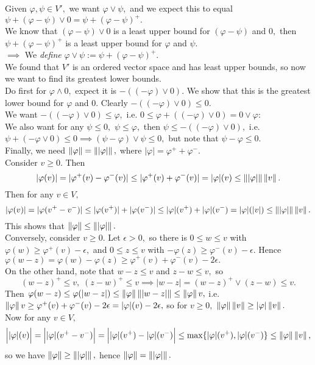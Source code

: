 \begin{thm}
{\begin{enumerate}
		Given $\varphi,\psi\in V',$ we want $\varphi\lor\psi,$ and we expect this to equal \\ $\psi+(\varphi-\psi)\lor 0=\psi+(\varphi-\psi)^+.$ \\
		We know that $(\varphi-\psi)\lor 0$ is a least upper bound for $(\varphi-\psi)$ and $0,$ then $\psi+(\varphi-\psi)^+$ is a least upper bound for $\varphi$ and $\psi.$ \\
		$\implies$ We \textit{define} $\varphi\lor\psi:=\psi+(\varphi-\psi)^+.$ \\
		We found that $V'$ is an ordered vector space and has least upper bounds, so now we want to find its greatest lower bounds. \\
		Do first for $\varphi\land 0,$ expect it is $-((-\varphi)\lor 0).$ We show that this is the greatest lower bound for $\varphi$ and $0.$ Clearly $-((-\varphi)\lor 0)\leq 0.$ \\
		We want $-((-\varphi)\lor 0)\leq\varphi,$ i.e. $0\leq\varphi+((-\varphi)\lor 0)=0\lor\varphi$: \\
		We also want for any $\psi\leq 0,$ $\psi\leq\varphi,$ then $\psi\leq -((-\varphi)\lor 0),$ i.e. \\
		$\psi+(-\varphi\lor 0)\leq 0\implies (\psi-\varphi)\lor\psi\leq 0,$ but note that $\psi-\varphi\leq 0.$ \\
		Finally, we need $\left\lVert\varphi\right\rVert=\left\lVert|\varphi|\right\rVert,$ where $|\varphi|=\varphi^++\varphi^-.$ \\
		Consider $v\geq 0.$ Then 
		$$|\varphi(v)|=|\varphi^+(v)-\varphi^-(v)|\leq|\varphi^+(v)+\varphi^-(v)|=|\varphi|(v)\leq\left\lVert|\varphi|\right\rVert\left\lVert v\right\rVert.$$
		Then for any $v\in V,$
		$$|\varphi(v)|=|\varphi(v^+-v^-)|\leq|\varphi(v^+)|+|\varphi(v^-)|\leq|\varphi|(v^+)+|\varphi|(v^-)=|\varphi|(|v|)\leq\left\lVert|\varphi|\right\rVert\left\lVert v\right\rVert.$$
		This shows that $\left\lVert\varphi\right\rVert\leq\left\lVert|\varphi|\right\rVert.$ \\
		Conversely, consider $v\geq 0.$ Let $\epsilon>0,$ so there is $0\leq w\leq v$ with $\varphi(w)\geq\varphi^+(v)-\epsilon,$ and $0\leq z\leq v$ with $-\varphi(z)\geq\varphi^-(v)-\epsilon.$ Hence $\varphi(w-z)=\varphi(w)-\varphi(z)\geq\varphi^+(v)+\varphi^-(v)-2\epsilon.$ \\
		On the other hand, note that $w-z\leq v$ and $z-w\leq v,$ so
		$$(w-z)^+\leq v,\;(z-w)^+\leq v\implies |w-z|=(w-z)^+\lor (z-w)\leq v.$$
		Then $\varphi(w-z)\leq\varphi(|w-z|)\leq\left\lVert\varphi\right\rVert\left\lVert|w-z|\right\rVert\leq\left\lVert\varphi\right\rVert{v},$ i.e. \\
		$\left\lVert\varphi\right\rVert{v}\geq\varphi^+(v)+\varphi^-(v)-2\epsilon=|\varphi|(v)-2\epsilon,$ so for $v\geq 0,$ $\left\lVert\varphi\right\rVert\left\lVert v\right\rVert\geq|\varphi|\left\lVert v\right\rVert.$ \\
		Now for any $v\in V,$
		$$\Big||\varphi|(v)\Big|=\Big||\varphi|(v^+-v^-)\Big|=\Big||\varphi|(v^+)-|\varphi|(v^-)\Big|\leq\max\{|\varphi|(v^+),|\varphi|(v^-)\}\leq\left\lVert\varphi\right\rVert\left\lVert v\right\rVert,$$
		so we have $\left\lVert\varphi\right\rVert\geq\left\lVert|\varphi|\right\rVert,$ hence $\left\lVert\varphi\right\rVert=\left\lVert|\varphi|\right\rVert.$
	\end{enumerate}
}
\end{thm}

